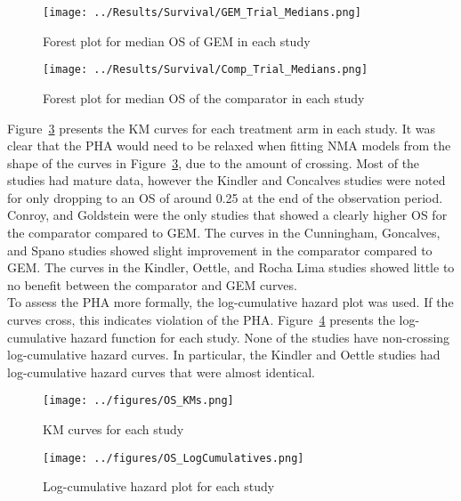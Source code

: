 \begin{figure}[h]
    \centering
    \texttt{[image: ../Results/Survival/GEM\_Trial\_Medians.png]} 
    \caption{Forest plot for median OS of GEM in each study}
    \label{fig:GEMMedForest}
\end{figure}

\begin{figure}[h]
    \centering
    \texttt{[image: ../Results/Survival/Comp\_Trial\_Medians.png]} 
    \caption{Forest plot for median OS of the comparator in each study}
    \label{fig:CompMedForest}
\end{figure}

Figure~\ref{fig:OSKMs} presents the KM curves for each treatment arm in each study. It was clear that the PHA would need to be relaxed when fitting NMA models from the shape of the curves in Figure~\ref{fig:OSKMs}, due to the amount of crossing. Most of the studies had mature data, however the Kindler and Concalves studies were noted for only dropping to an OS of around 0.25 at the end of the observation period. Conroy, and Goldstein were the only studies that showed a clearly higher OS for the comparator compared to GEM. The curves in the Cunningham, Goncalves, and Spano studies showed slight improvement in the comparator compared to GEM. The curves in the Kindler, Oettle, and Rocha Lima studies showed little to no benefit between the comparator and GEM curves. \\

To assess the PHA more formally, the log-cumulative hazard plot was used. If the curves cross, this indicates violation of the PHA. Figure~\ref{fig:OSLCs} presents the log-cumulative hazard function for each study. None of the studies have non-crossing log-cumulative hazard curves. In particular, the Kindler and Oettle studies had log-cumulative hazard curves that were almost identical. \\

\begin{figure}[h]
    \centering
    \texttt{[image: ../figures/OS\_KMs.png]} 
    \caption{KM curves for each study}
    \label{fig:OSKMs}
\end{figure}

\begin{figure}[h]
    \centering
    \texttt{[image: ../figures/OS\_LogCumulatives.png]} 
    \caption{Log-cumulative hazard plot for each study}
    \label{fig:OSLCs}
\end{figure}

